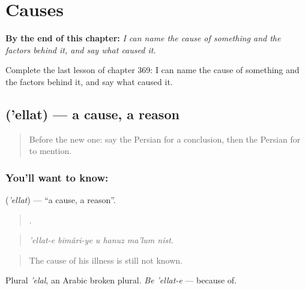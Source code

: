 
\chapter{Causes}
\label{ch:fa-causes}

\begin{chapteropening}
\textbf{By the end of this chapter:} \emph{I can name the cause of something and the factors behind it, and say what caused it.}

Complete the last lesson of chapter 369: I can name the cause of something and the factors behind it, and say what caused it.
\end{chapteropening}

\section[\texorpdfstring{\fa{علت} ('ellat)}{علت ('ellat)}]{ ('ellat) — a cause, a reason}

\label{lesson:FA-C369-ellat}



\begin{quote}
Before the new one: say the Persian for a conclusion, then the Persian for to mention.
\end{quote}

\subsection*{You'll want to know: }
\textbf{} (\emph{'ellat}) — \textquotedblleft{}a cause, a reason\textquotedblright{}.

\begin{quote}
     .
\end{quote}

\begin{quote}
\emph{'ellat-e bimâri-ye u hanuz ma'lum nist.}
\end{quote}

\begin{quote}
The cause of his illness is still not known.
\end{quote}

Plural \emph{'elal}, an Arabic broken plural. \emph{Be 'ellat-e} — because of.

